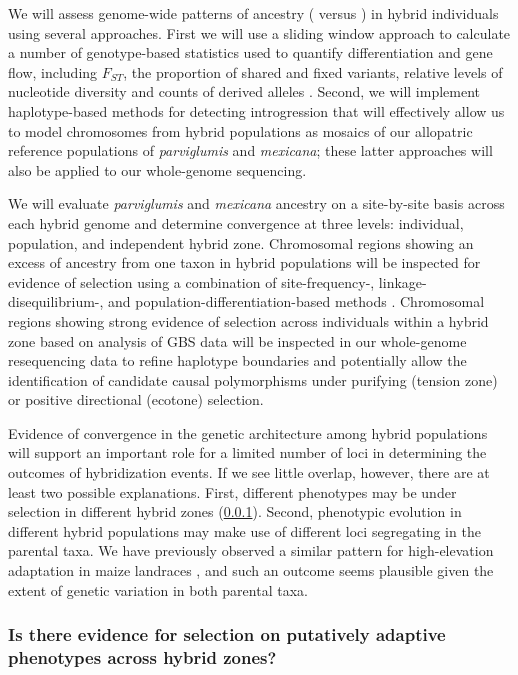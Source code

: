 We will assess genome-wide patterns of ancestry (\zp{} versus \zm{}) in hybrid individuals using several approaches.  
First we will use a sliding window approach to calculate a number of genotype-based statistics used to quantify differentiation and gene flow, including  $F_{ST}$, the proportion of shared and fixed variants, relative levels of nucleotide diversity \citep{Geneva2014} and counts of derived alleles \citep{martin2015evaluating}.
Second, we will implement haplotype-based methods for detecting introgression \citep[\emph{e.g.},][]{price2009, lawson2012} that will effectively allow us to model chromosomes from hybrid populations as mosaics of our allopatric reference populations of \emph{parviglumis} and \emph{mexicana}; these latter approaches will also be applied to our whole-genome sequencing. 

We will evaluate \emph{parviglumis} and \emph{mexicana} ancestry on a site-by-site basis across each hybrid genome and determine convergence at three levels: individual, population, and independent hybrid zone.  
Chromosomal regions showing an excess of ancestry from one taxon in hybrid populations will be inspected for evidence of selection using a combination of site-frequency-, linkage-disequilibrium-, and population-differentiation-based methods \citep[reviewed in][]{Vitti2013}.
Chromosomal regions showing strong evidence of selection across individuals within a hybrid zone based on analysis of GBS data will be inspected in our whole-genome resequencing data to refine haplotype boundaries and potentially allow the identification of candidate causal polymorphisms under purifying (tension zone) or positive directional (ecotone) selection.

Evidence of convergence in the genetic architecture among hybrid populations will support an important role for a limited number of loci in determining the outcomes of hybridization events.
If we see little overlap, however, there are at least two possible explanations.  
First, different phenotypes may be under selection in different hybrid zones (\ref{sss:driftsel}). 
Second, phenotypic evolution in different hybrid populations may make use of different loci segregating in the parental taxa.
We have previously observed a similar pattern for high-elevation adaptation in maize landraces \citep{Takuno15062015}, and such an outcome seems plausible given the extent of genetic variation in both parental taxa.

\subsubsection{Is there evidence for selection on putatively adaptive phenotypes across hybrid zones?}
\label{sss:driftsel}


